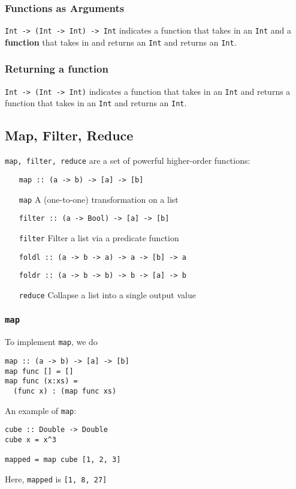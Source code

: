 \documentclass{article}
\begin{document}
\subsubsection*{Functions as Arguments} \texttt{Int -> (Int -> Int) ->
Int} indicates a function that takes in an \texttt{Int} and a
\textbf{function} that takes in and returns an \texttt{Int} and returns an \texttt{Int}.

\subsubsection*{Returning a function} \texttt{Int -> (Int -> Int)}
indicates a function that takes in an \texttt{Int} and returns a
function that takes in an \texttt{Int} and returns an \texttt{Int}.





\subsection{Map, Filter, Reduce} \texttt{map, filter, reduce} are a
set of powerful higher-order functions:
\begin{enumerate}[align=left]
\item [\texttt{map :: (a -> b) -> [a] -> [b]}]
\item [\texttt{map}] A (one-to-one) transformation on a list \\
\item [\texttt{filter :: (a -> Bool) -> [a] -> [b]}]
\item [\texttt{filter}] Filter a list via a predicate function \\
\item [\texttt{foldl :: (a -> b -> a) -> a -> [b] -> a}]
\item [\texttt{foldr :: (a -> b -> b) -> b -> [a] -> b}]
\item [\texttt{reduce}] Collapse a list into a single output value
\end{enumerate}

\subsubsection{\texttt{map}} To implement \texttt{map}, we do
\begin{verbatim}
map :: (a -> b) -> [a] -> [b]
map func [] = []
map func (x:xs) =
  (func x) : (map func xs)
\end{verbatim}
An example of \texttt{map}:
\begin{verbatim}
cube :: Double -> Double
cube x = x^3

mapped = map cube [1, 2, 3]
\end{verbatim}
Here, \texttt{mapped} is \texttt{[1, 8, 27]}
\end{document}
